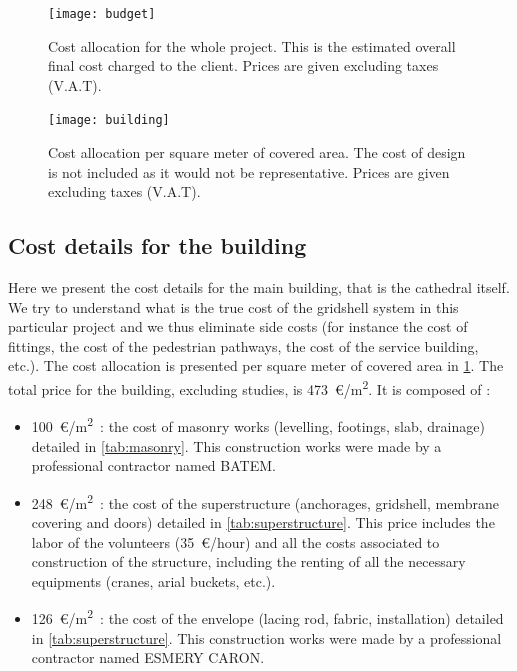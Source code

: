 \begin{figure}[h]
\begin{fullpage}
\centering
	\texttt{[image: budget]}\vspace{10pt}
	\caption[Cost allocation for the whole project]{Cost allocation for the whole project. This is the estimated overall final cost charged to the client. Prices are given excluding taxes (V.A.T).}
	\label{fig:budget}
	\vspace{2cm}
	\texttt{[image: building]}\vspace{10pt}
	\caption[Cost allocation per square meter of covered area]{Cost allocation per square meter of covered area. The cost of design is not included as it would not be representative. Prices are given excluding taxes (V.A.T).}
	\label{fig:building}
	\end{fullpage}
\end{figure}

\subsection{Cost details for the building}\label{sec:gs_cost}
Here we present the cost details for the main building, that is the cathedral itself. We try to understand what is the true cost of the gridshell system in this particular project and we thus eliminate side costs (for instance the cost of fittings, the cost of the pedestrian pathways, the cost of the service building, etc.). The cost allocation is presented per square meter of covered area in \cref{fig:building}. The total price for the building, excluding studies, is 473~€/m\textsuperscript{2}. It is composed of :
\begin{itemize}
\item  100~€/m\textsuperscript{2}~: the cost of masonry works (levelling, footings, slab, drainage) detailed in \cref{tab:masonry}. This construction works were made by a professional contractor named BATEM.
\item  248~€/m\textsuperscript{2}~: the cost of the superstructure (anchorages, gridshell, membrane covering and doors) detailed in \cref{tab:superstructure}. This price includes the labor of the volunteers (35~€/hour) and all the costs associated to construction of the structure, including the renting of all the necessary equipments (cranes, arial buckets, etc.).
\item  126~€/m\textsuperscript{2}~: the cost of the envelope (lacing rod, fabric, installation) detailed in \cref{tab:superstructure}. This construction works were made by a professional contractor named ESMERY CARON.
\end{itemize}

